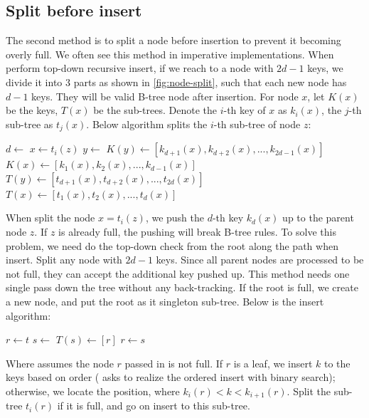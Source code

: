 \documentclass[b5paper]{article}
\begin{document}
\subsection{Split before insert}

The second method is to split a node before insertion to prevent it becoming overly full. We often see this method in imperative implementations. When perform top-down recursive insert, if we reach to a node with $2d - 1$ keys, we divide it into 3 parts as shown in \cref{fig:node-split}, such that each new node has $d - 1$ keys. They will be valid B-tree node after insertion. For node $x$, let $K(x)$ be the keys, $T(x)$ be the sub-trees. Denote the $i$-th key of $x$ as $k_i(x)$, the $j$-th sub-tree as $t_j(x)$. Below algorithm splits the $i$-th sub-tree of node $z$:

\begin{algorithmic}[1]
  \State $d \gets$ 
  \State $x \gets t_i(z)$
  \State $y \gets$ 
  \State $K(y) \gets [k_{d + 1}(x), k_{d + 2}(x), ..., k_{2d - 1}(x)]$
  \State $K(x) \gets [k_1(x), k_2(x), ..., k_{d-1}(x)]$
    \State $T(y) \gets [t_{d + 1}(x), t_{d + 2}(x), ..., t_{2d}(x)]$
    \State $T(x) \gets [t_1(x), t_2(x), ..., t_d(x)]$
  \EndIf
  \State {}
  \State {}
\EndProcedure
\end{algorithmic}

When split the node $x = t_i(z)$, we push the $d$-th key $k_d(x)$ up to the parent node $z$. If $z$ is already full, the pushing will break B-tree rules. To solve this problem, we need do the top-down check from the root along the path when insert. Split any node with $2d - 1$ keys. Since all parent nodes are processed to be not full, they can accept the additional key pushed up. This method needs one single pass down the tree without any back-tracking. If the root is full, we create a new node, and put the root as it singleton sub-tree. Below is the insert algorithm:

\begin{algorithmic}[1]
  \State $r \gets t$
   
    \State $s \gets$ 
    \State $T(s) \gets [ r ]$
    \State {}
    \State $r \gets s$
  \EndIf
  \State \Return {}
\EndFunction
\end{algorithmic}

Where  assumes the node $r$ passed in
is not full. If $r$ is a leaf, we insert $k$ to the keys based on order ( asks to realize the ordered insert with binary search); otherwise, we locate the position, where $k_i(r) < k < k_{i+1}(r)$. Split the sub-tree $t_i(r)$ if it is full, and go on insert to this sub-tree.
\end{document}
